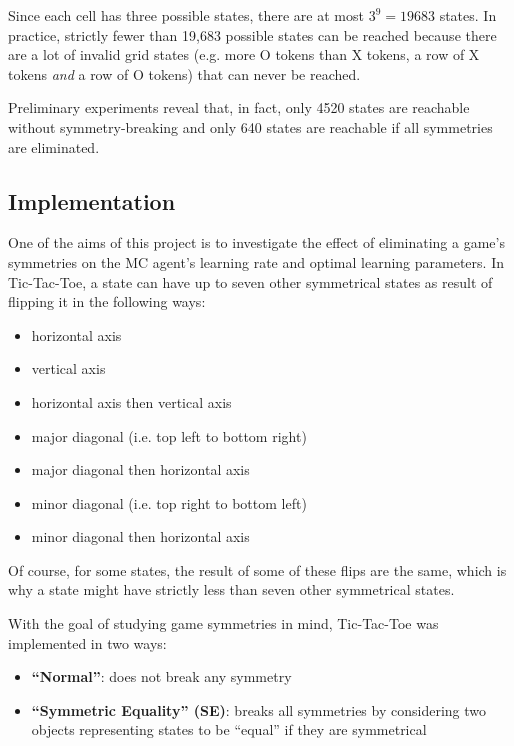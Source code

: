 \documentclass[11pt,a4paper]{report}
\begin{document}
Since each cell has three possible states, there are at most $3^9 = 19683$ states. In practice, strictly fewer than 19,683 possible states can be reached because there are a lot of invalid grid states (e.g. more O tokens than X tokens, a row of X tokens \emph{and} a row of O tokens) that can never be reached.

Preliminary experiments reveal that, in fact, only 4520 states are reachable without symmetry-breaking and only 640 states are reachable if all symmetries are eliminated.


\subsection{Implementation}
\label{sec:TicTacToeImplementation}

One of the aims of this project is to investigate the effect of eliminating a game's symmetries on the MC agent's learning rate and optimal learning parameters. In Tic-Tac-Toe, a state can have up to seven other symmetrical states as result of flipping it in the following ways:

\begin{itemize}
	\item horizontal axis
	\item vertical axis
	\item horizontal axis then vertical axis
	\item major diagonal (i.e. top left to bottom right)
	\item major diagonal then horizontal axis
	\item minor diagonal (i.e. top right to bottom left)
	\item minor diagonal then horizontal axis
\end{itemize}

Of course, for some states, the result of some of these flips are the same, which is why a state might have strictly less than seven other symmetrical states.

With the goal of studying game symmetries in mind, Tic-Tac-Toe was implemented in two ways:

\begin{itemize}

	\item \textbf{``Normal''}:
does not break any symmetry

	\item \textbf{``Symmetric Equality'' (SE)}: 
breaks all symmetries by considering two objects representing states to be ``equal'' if they are symmetrical

\end{itemize}
\end{document}
